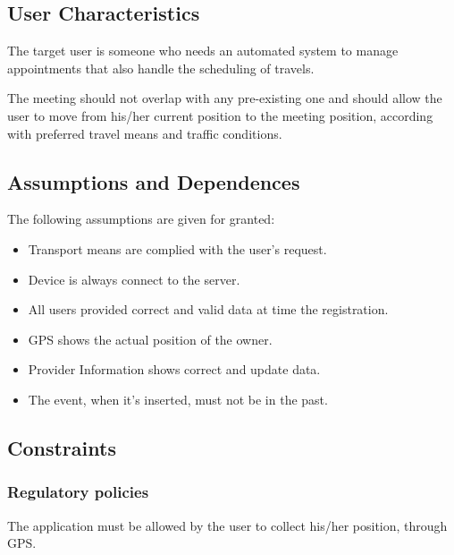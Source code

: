 \documentclass{article}
\begin{document}
	
	\subsection{User Characteristics}
	The target user is someone who needs an automated system to manage appointments that also handle the scheduling of travels.
	
	The meeting should not overlap with any pre-existing one and should allow the user to move from his/her current position to the meeting position, according with preferred travel means and traffic conditions.
	
	
	\subsection{Assumptions and Dependences}
	The following assumptions are given for granted:
	\begin{itemize}
		\item  Transport means are complied with the user's request.
		\item  Device is always connect to the server.
		\item  All users provided correct and valid data at time the registration.
		\item  GPS shows the actual position of the owner.
		\item  Provider Information shows correct and update data.
		\item  The event, when it's inserted, must not be in the past.
	\end{itemize}
	
	
	\subsection{Constraints}
	
	
	\subsubsection{Regulatory policies}
	The application must be allowed by the user to collect his/her position, through GPS.
	
	
\end{document}

